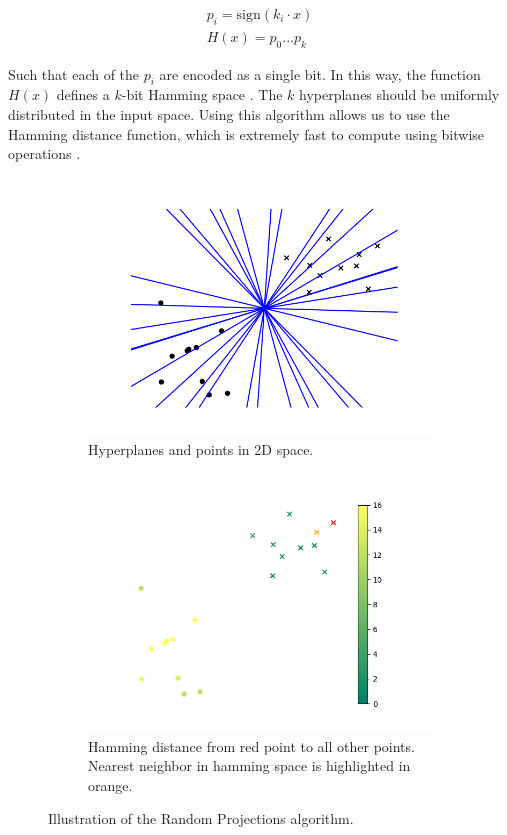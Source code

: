 \begin{align}
    p_i = \text{sign}(k_i \cdot x) \\
    H(x) = p_0...p_k
\end{align}

Such that each of the $p_i$ are encoded as a single bit. In this way, the function $H(x)$ defines a $k$-bit Hamming space \cite{hamming1950error}. The $k$ hyperplanes should be uniformly distributed in the input space. Using this algorithm allows us to use the Hamming distance function, which is extremely fast to compute using bitwise operations \cite{cohen1997covering}.

\begin{figure}[h]
    \centering
    \begin{subfigure}[t]{0.24\textwidth}
            \includegraphics[width=\textwidth]{images/lsh_planes.png}
            \caption{Hyperplanes and points in 2D space.}      
    \end{subfigure} 
    \begin{subfigure}[t]{0.24\textwidth}
            \includegraphics[width=\textwidth]{images/lsh_distance.png}
            \caption{Hamming distance from red point to all other points. Nearest neighbor in hamming space is highlighted in orange.}
    \end{subfigure}
    \caption{Illustration of the Random Projections algorithm.}
    \label{fig:lsh}
\end{figure}

